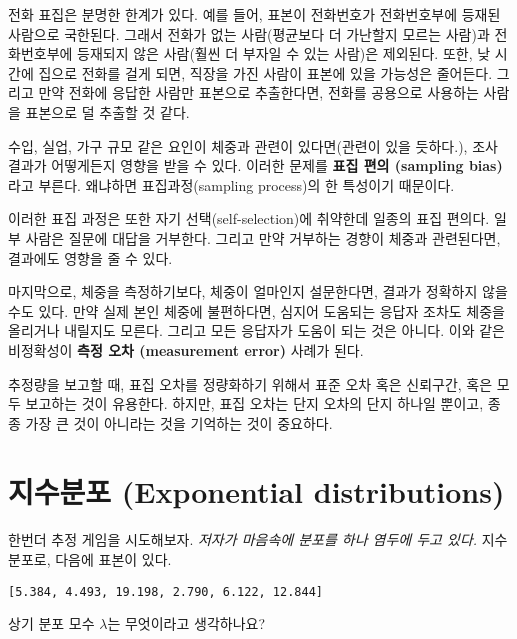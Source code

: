 
전화 표집은 분명한 한계가 있다.
예를 들어, 표본이 전화번호가 전화번호부에 등재된 사람으로 국한된다.
그래서 전화가 없는 사람(평균보다 더 가난할지 모르는 사람)과 전화번호부에 등재되지 않은 사람(훨씬 더 부자일 수 있는 사람)은 제외된다. 
또한, 낮 시간에 집으로 전화를 걸게 되면, 직장을 가진 사람이 표본에 있을 가능성은 줄어든다. 그리고 만약 전화에 응답한 사람만 표본으로 추출한다면, 전화를 공용으로 사용하는 사람을 표본으로 덜 추출할 것 같다.

수입, 실업, 가구 규모 같은 요인이 체중과 관련이 있다면(관련이 있을 듯하다.), 조사 결과가 어떻게든지 영향을 받을 수 있다. 이러한 문제를 {\bf 표집 편의 (sampling bias)}라고 부른다. 왜냐하면 표집과정(sampling process)의 한 특성이기 때문이다.

이러한 표집 과정은 또한 자기 선택(self-selection)에 취약한데 일종의 표집 편의다.
일부 사람은 질문에 대답을 거부한다. 그리고 만약 거부하는 경향이 체중과 관련된다면, 결과에도 영향을 줄 수 있다.

마지막으로, 체중을 측정하기보다, 체중이 얼마인지 설문한다면, 결과가 정확하지 않을 수도 있다.
만약 실제 본인 체중에 불편하다면, 심지어 도움되는 응답자 조차도 체중을 올리거나 내릴지도 모른다. 그리고 모든 응답자가 도움이 되는 것은 아니다.
이와 같은 비정확성이 {\bf 측정 오차 (measurement error)} 사례가 된다.

추정량을 보고할 때, 표집 오차를 정량화하기 위해서 표준 오차 혹은 신뢰구간, 혹은 모두 보고하는 것이 유용한다.
하지만, 표집 오차는 단지 오차의 단지 하나일 뿐이고, 종종 가장 큰 것이 아니라는 것을 기억하는 것이 중요하다.


\section{지수분포 (Exponential distributions)}

한번더 추정 게임을 시도해보자. 
{\em 저자가 마음속에 분포를 하나 염두에 두고 있다.}
지수분포로, 다음에 표본이 있다.

{\tt [5.384, 4.493, 19.198, 2.790, 6.122, 12.844]}

상기 분포 모수 $\lambda$는 무엇이라고 생각하나요?


